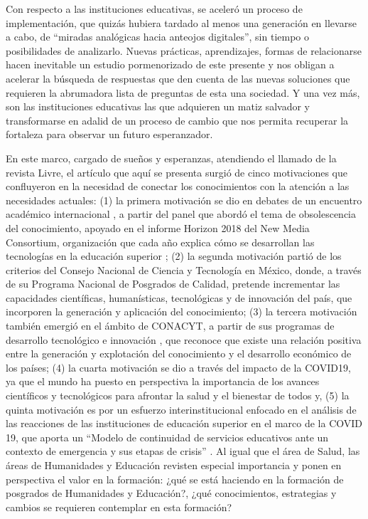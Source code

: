 \documentclass[spanish]{textolivre}
\begin{document}
Con respecto a las instituciones educativas, se aceleró un proceso de implementación, que quizás hubiera tardado al menos una generación en llevarse a cabo,  de “miradas analógicas hacia anteojos digitales”, sin tiempo o posibilidades de analizarlo. Nuevas prácticas, aprendizajes, formas de relacionarse hacen inevitable un estudio pormenorizado de este presente y nos obligan a acelerar la búsqueda de respuestas que den cuenta de las nuevas soluciones que requieren la abrumadora lista de preguntas de esta una sociedad. Y una vez más, son las instituciones educativas las que adquieren un matiz salvador y transformarse en adalid de un proceso de cambio que nos permita recuperar la fortaleza para observar un futuro esperanzador.

En este marco, cargado de sueños y esperanzas, atendiendo el llamado de la revista Livre, el artículo que aquí se presenta surgió de cinco motivaciones que confluyeron en la necesidad de conectar los conocimientos con la atención a las necesidades actuales: (1) la primera motivación se dio en debates de un encuentro académico internacional \cite{carrera_educacion_2018}, a partir del panel que abordó el tema de obsolescencia del conocimiento, apoyado en el informe Horizon 2018 del New Media Consortium, organización que cada año explica cómo se desarrollan las tecnologías en la educación superior \cite{the_new_media_consortium-_horizon_report_horizon_2018};  (2)  la segunda motivación partió de los criterios del Consejo Nacional de Ciencia y Tecnología \cite{consejo_nacional_de_ciencia_y_tecnologia_conacyt_programa2020a} en México, donde, a través de su Programa Nacional de Posgrados de Calidad, pretende incrementar las capacidades científicas, humanísticas, tecnológicas y de innovación del país, que incorporen la generación y aplicación del conocimiento; (3)  la tercera motivación también emergió en el ámbito de CONACYT, a partir de sus programas de desarrollo tecnológico e innovación \cite{consejo_nacional_de_ciencia_y_tecnologia_conacyt_desarrollo_2020b}, que reconoce que existe una relación positiva entre la generación y explotación del conocimiento y el desarrollo económico de los países; (4) la cuarta motivación se dio a través del impacto de la COVID19, ya que el mundo ha puesto en perspectiva la importancia de los avances científicos y tecnológicos para afrontar la salud y el bienestar de todos y, (5) la quinta motivación es por un esfuerzo interinstitucional enfocado en el análisis de las reacciones de las instituciones de educación superior en el marco de la COVID 19, que aporta un “Modelo de continuidad de servicios educativos ante un contexto de emergencia y sus etapas de crisis” \cite{vicario-solorzano_modelo_2021}. Al igual que el área de Salud, las áreas de Humanidades y Educación revisten especial importancia y ponen en perspectiva el valor en la formación: ¿qué se está haciendo en la formación de posgrados de Humanidades y Educación?, ¿qué conocimientos, estrategias y cambios se requieren contemplar en esta formación?
\end{document}
